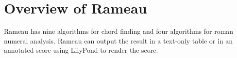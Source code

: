 \section{Overview of Rameau}
\label{sec:system}



Rameau has nine algorithms for chord finding and four algorithms for
roman numeral analysis. Rameau can output the result in a text-only
table or in an annotated score using LilyPond
\cite{nienhuys.ea08:lilypond} to render the score.





